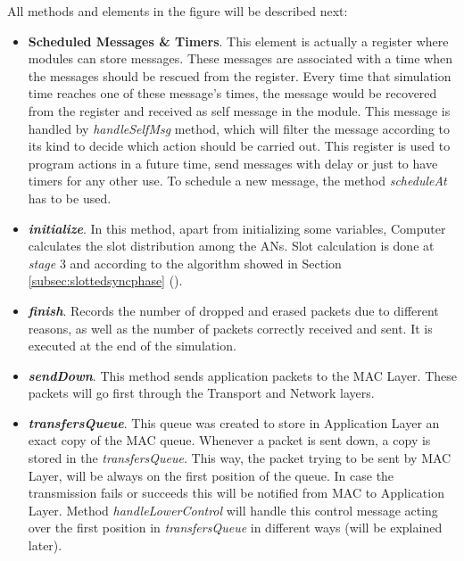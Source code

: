 All methods and elements in the figure will be described next:

\begin{itemize}
  \item \textbf{Scheduled Messages \& Timers}. This element is actually a register where modules can store messages. These messages are associated 
  with a time when the messages should be rescued from the register. Every time that simulation time reaches one of these message's times, the 
  message would be recovered from the register and received as self message in the module. This message is handled by \textit{handleSelfMsg} method, 
  which will filter the message according to its kind to decide which action should be carried out. This register is used to program actions in a 
  future time, send messages with delay or just to have timers for any other use. To schedule a new message, the method \textit{scheduleAt} has 
  to be used.
 
  \item \textbf{\textit{initialize}}. In this method, apart from initializing some variables, Computer calculates the slot distribution among the 
  \acp{AN}. Slot calculation is done at \textit{stage} 3 and according to the algorithm showed in Section \ref{subsec:slottedsyncphase} 
  (). 

  \item \textbf{\textit{finish}}. Records the number of dropped and erased packets due to different reasons, as well as the number of packets
  correctly received and sent. It is executed at the end of the simulation.

  \item \textbf{\textit{sendDown}}. This method sends application packets to the \ac{MAC} Layer. These packets will go first through the Transport 
  and Network layers.

  \item \textbf{\textit{transfersQueue}}. This queue was created to store in Application Layer an exact copy of the \ac{MAC} queue. Whenever a packet
  is sent down, a copy is stored in the \textit{transfersQueue}. This way, the packet trying to be sent by \ac{MAC} Layer, will be always on the
  first position of the queue. In case the transmission fails or succeeds this will be notified from \ac{MAC} to Application Layer. Method
  \textit{handleLowerControl} will handle this control message acting over the first position in \textit{transfersQueue} in different ways (will 
  be explained later).


\end{itemize}
